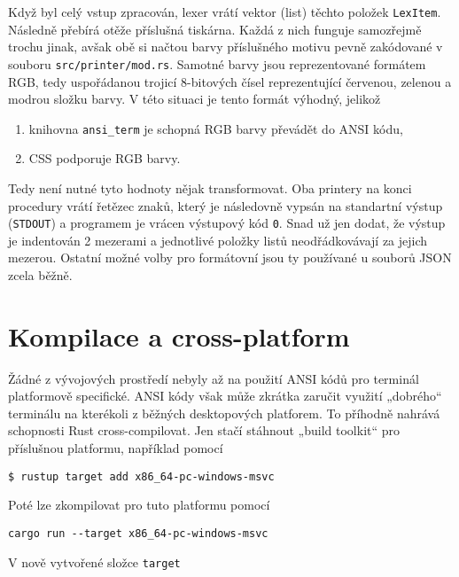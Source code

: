 \documentclass[11pt, letterpaper]{article}
\begin{document}
Když byl celý vstup zpracován, lexer vrátí vektor (list) těchto položek \texttt{LexItem}. Následně přebírá otěže příslušná tiskárna. Každá z nich funguje samozřejmě trochu jinak, avšak obě si načtou barvy příslušného motivu pevně zakódované v souboru \texttt{src/printer/mod.rs}. Samotné barvy jsou reprezentované formátem RGB, tedy uspořádanou trojicí 8-bitových čísel reprezentující červenou, zelenou a modrou složku barvy. V této situaci je tento formát výhodný, jelikož
\begin{enumerate}
    \item knihovna \texttt{ansi\_term} je schopná RGB barvy převádět do ANSI kódu,
    \item CSS podporuje RGB barvy.
\end{enumerate}

Tedy není nutné tyto hodnoty nějak transformovat. Oba printery na konci procedury vrátí řetězec znaků, který je následovně vypsán na standartní výstup (\texttt{STDOUT}) a programem je vrácen výstupový kód \texttt{0}. Snad už jen dodat, že výstup je indentován 2 mezerami a jednotlivé položky listů neodřádkovávají za jejich mezerou. Ostatní možné volby pro formátovní jsou ty používané u souborů JSON zcela běžně.

\section{Kompilace a cross-platform}
Žádné z vývojových prostředí nebyly až na použití ANSI kódů pro terminál platformově specifické. ANSI kódy však může zkrátka zaručit využití „dobrého“ terminálu na kterékoli z běžných desktopových platforem. To příhodně nahrává schopnosti Rust cross-compilovat. Jen stačí stáhnout „build toolkit“ pro příslušnou platformu, například pomocí
\begin{lstlisting}
$ rustup target add x86_64-pc-windows-msvc
\end{lstlisting}

Poté lze zkompilovat pro tuto platformu pomocí
\begin{lstlisting}
cargo run --target x86_64-pc-windows-msvc
\end{lstlisting}

V nově vytvořené složce \texttt{target }
\end{document}
